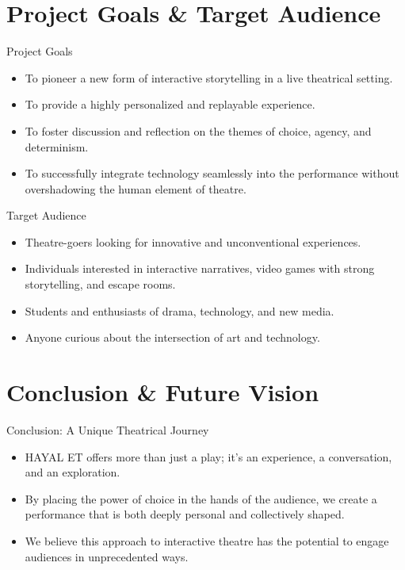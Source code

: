 \documentclass[aspectratio=169]{beamer}
\begin{document}
\section{Project Goals \& Target Audience}
\begin{frame}{Project Goals}
    \begin{itemize}
        \item To pioneer a new form of interactive storytelling in a live theatrical setting.
        \item To provide a highly personalized and replayable experience.
        \item To foster discussion and reflection on the themes of choice, agency, and determinism.
        \item To successfully integrate technology seamlessly into the performance without overshadowing the human element of theatre.
    \end{itemize}
\end{frame}

\begin{frame}{Target Audience}
    \begin{itemize}
        \item Theatre-goers looking for innovative and unconventional experiences.
        \item Individuals interested in interactive narratives, video games with strong storytelling, and escape rooms.
        \item Students and enthusiasts of drama, technology, and new media.
        \item Anyone curious about the intersection of art and technology.
    \end{itemize}
\end{frame}


\section{Conclusion \& Future Vision}
\begin{frame}{Conclusion: A Unique Theatrical Journey}
    \begin{itemize}
        \item HAYAL ET offers more than just a play; it's an experience, a conversation, and an exploration.
        \item By placing the power of choice in the hands of the audience, we create a performance that is both deeply personal and collectively shaped.
        \item We believe this approach to interactive theatre has the potential to engage audiences in unprecedented ways.
    \end{itemize}
\end{frame}
\end{document}
